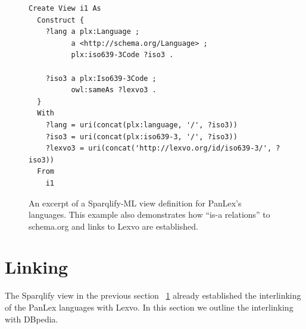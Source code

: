 \documentclass[sw]{iosart2c}
\begin{document}
\begin{figure}
\centering
\begin{lstlisting}[basicstyle=\footnotesize\ttfamily]
Create View i1 As
  Construct {
    ?lang a plx:Language ;
          a <http://schema.org/Language> ;
          plx:iso639-3Code ?iso3 .

    ?iso3 a plx:Iso639-3Code ;
          owl:sameAs ?lexvo3 .
  }
  With
    ?lang = uri(concat(plx:language, '/', ?iso3))
    ?iso3 = uri(concat(plx:iso639-3, '/', ?iso3))
    ?lexvo3 = uri(concat('http://lexvo.org/id/iso639-3/', ?iso3))
  From
    i1
\end{lstlisting}
\caption{An excerpt of a Sparqlify-ML view definition for PanLex's languages. This
example also demonstrates how ``is-a relations'' to schema.org and links to Lexvo are established.}
\label{fig:ex:sparqlify-ml}
\end{figure}


\section{Linking}
\label{sec:linking}
The Sparqlify view in the previous section ~\ref{fig:ex:sparqlify-ml} already
established the interlinking of the PanLex languages with Lexvo.
In this section we outline the interlinking with DBpedia.

\end{document}
